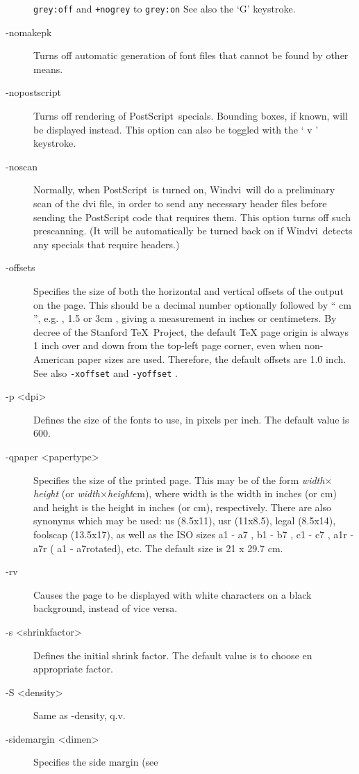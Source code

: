 \documentclass[a4paper,11pt]{article}
\def\WDVI{\textsf{Windvi}}
\begin{document}
\begin{description}
  \texttt{grey:off} and  \texttt{+nogrey} to \texttt{grey:on} See also
  the `G' keystroke.
\item[-nomakepk] Turns off automatic generation of font files that
  cannot be found by other means.
\item[-nopostscript] Turns off rendering of PostScript\TM\ specials.  
Bounding boxes, if known, will be displayed instead.  
This option can also be toggled with the ` v ' keystroke.
\item[-noscan] Normally, when PostScript\TM\ is turned on,
\WDVI\ will do a preliminary scan of the dvi
file, in order to send any necessary header files before sending the
PostScript code that requires them.  This option turns off such prescanning.
(It will be automatically be turned back on if
\WDVI\
detects any specials that require headers.) 
\item[-offsets] Specifies the size of both the horizontal and vertical
  offsets of the output on the page.  This should be a decimal number
  optionally followed by `` cm '', e.g. , 1.5 or 3cm , giving a
  measurement in inches or centimeters.  By decree of the Stanford
  \TeX\ Project, the default \TeX{} page origin is always 1 inch
  over and down from the top-left page corner, even when non-American
  paper sizes are used.  Therefore, the default offsets are 1.0 inch.
  See also \texttt{-xoffset} and \texttt{-yoffset} .
\item[-p <dpi>] Defines the size of the fonts to use, in pixels per
  inch.  The default value is 600.
\item[-qpaper <papertype>] Specifies the size of the printed page.
  This may be of the form \emph{width}$\times$\emph{height} (or
  \emph{width}$\times$\emph{height}cm), where width is the width in
  inches (or cm) and height is the height in inches (or cm),
  respectively.  There are also synonyms which may be used: us
  (8.5x11), usr (11x8.5), legal (8.5x14), foolscap (13.5x17), as well
  as the ISO sizes a1 - a7 , b1 - b7 , c1 - c7 , a1r - a7r ( a1 -
  a7rotated), etc.  The default size is 21 x 29.7 cm.
\item[-rv] Causes the page to be displayed with white characters on a
  black background, instead of vice versa.
\item[-s <shrinkfactor>] Defines the initial shrink factor.  The
  default value is to choose en appropriate factor.
\item[-S <density>] Same as -density, q.v.
\item[-sidemargin <dimen>] Specifies the side margin (see

\end{description}
\end{document}
